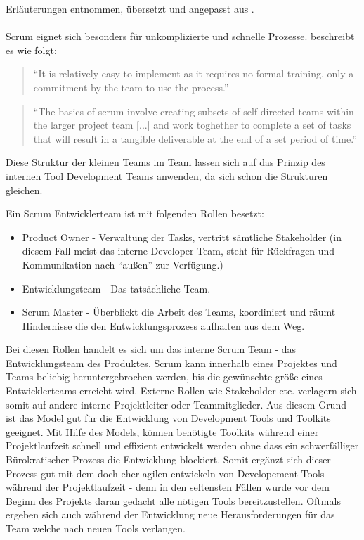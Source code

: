 \documentclass[pagesize, paper=a4, fontsize=12pt, titlepage=true, headings=small, headnosepline, abstractoff, liststotoc, nochapterprefix, plainheadsepline, twoside]{scrreprt}
\begin{document}
Erläuterungen entnommen, übersetzt und angepasst aus \cite[S. 11]{Schwaber2004}.
\\
\\
Scrum eignet sich besonders für unkomplizierte und schnelle Prozesse. \autocite{Chandler2006} beschreibt es wie folgt:
\begin{quote}
“It is relatively easy to implement as it requires no formal training, only a commitment by the team to use the process.”
\cite[S. 45]{Chandler2006}
\end{quote}
\begin{quote}
“The basics of scrum involve creating subsets of self-directed teams within the larger project team [...] and work toghether to complete a set of tasks that will result in a tangible deliverable at the end of a set period of time.”
\cite[S. 45]{Chandler2006}
\end{quote}
Diese Struktur der kleinen Teams im Team lassen sich auf das Prinzip des internen Tool Development Teams anwenden, da sich schon die Strukturen gleichen.

Ein Scrum Entwicklerteam ist mit folgenden Rollen besetzt:
\begin{itemize}
\item Product Owner - Verwaltung der Tasks, vertritt sämtliche Stakeholder (in diesem Fall meist das interne Developer Team, steht für Rückfragen und Kommunikation nach “außen” zur Verfügung.)
\item Entwicklungsteam - Das tatsächliche Team.
\item Scrum Master - Überblickt die Arbeit des Teams, koordiniert und räumt Hindernisse die den Entwicklungsprozess aufhalten aus dem Weg.
\end{itemize}

Bei diesen Rollen handelt es sich um das interne Scrum Team - das Entwicklungsteam des Produktes. Scrum kann innerhalb eines Projektes und Teams beliebig heruntergebrochen werden, bis die gewünschte größe eines Entwicklerteams erreicht wird. Externe Rollen wie Stakeholder etc. verlagern sich somit auf andere interne Projektleiter oder Teammitglieder. Aus diesem Grund ist das Model gut für die Entwicklung von Development Tools und Toolkits geeignet. Mit Hilfe des Models, können benötigte Toolkits während einer Projektlaufzeit schnell und effizient entwickelt werden ohne dass ein schwerfälliger Bürokratischer Prozess die Entwicklung blockiert. Somit ergänzt sich dieser Prozess gut mit dem doch eher agilen entwickeln von Developement Tools während der Projektlaufzeit - denn in den seltensten Fällen wurde vor dem Beginn des Projekts daran gedacht alle nötigen Tools bereitzustellen. Oftmals ergeben sich auch während der Entwicklung neue Herausforderungen für das Team welche nach neuen Tools verlangen.
\end{document}

